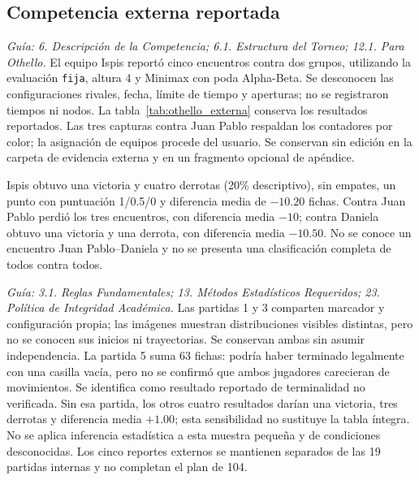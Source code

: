 \subsection{Competencia externa reportada}
\textit{Guía: 6. Descripción de la Competencia; 6.1. Estructura del Torneo; 12.1. Para Othello.}
El equipo Ispis reportó cinco encuentros contra dos grupos, utilizando la evaluación \texttt{fija}, altura 4 y Minimax con poda Alpha-Beta. Se desconocen las configuraciones rivales, fecha, límite de tiempo y aperturas; no se registraron tiempos ni nodos. La tabla~\ref{tab:othello_externa} conserva los resultados reportados. Las tres capturas contra Juan Pablo respaldan los contadores por color; la asignación de equipos procede del usuario. Se conservan sin edición en la carpeta de evidencia externa y en un fragmento opcional de apéndice.


Ispis obtuvo una victoria y cuatro derrotas (20\% descriptivo), sin empates, un punto con puntuación 1/0.5/0 y diferencia media de $-10.20$ fichas. Contra Juan Pablo perdió los tres encuentros, con diferencia media $-10$; contra Daniela obtuvo una victoria y una derrota, con diferencia media $-10.50$. No se conoce un encuentro Juan Pablo--Daniela y no se presenta una clasificación completa de todos contra todos.

\textit{Guía: 3.1. Reglas Fundamentales; 13. Métodos Estadísticos Requeridos; 23. Política de Integridad Académica.}
Las partidas 1 y 3 comparten marcador y configuración propia; las imágenes muestran distribuciones visibles distintas, pero no se conocen sus inicios ni trayectorias. Se conservan ambas sin asumir independencia. La partida 5 suma 63 fichas: podría haber terminado legalmente con una casilla vacía, pero no se confirmó que ambos jugadores carecieran de movimientos. Se identifica como resultado reportado de terminalidad no verificada. Sin esa partida, los otros cuatro resultados darían una victoria, tres derrotas y diferencia media $+1.00$; esta sensibilidad no sustituye la tabla íntegra. No se aplica inferencia estadística a esta muestra pequeña y de condiciones desconocidas. Los cinco reportes externos se mantienen separados de las 19 partidas internas y no completan el plan de 104.

